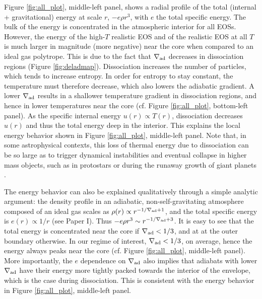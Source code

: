 \documentclass[apj]{emulateapj}
\newcommand{\delad}{\nabla_{\rm ad}}
\begin{document}
Figure \ref{fig:all_plot}, middle-left panel, shows a radial profile of the total (internal + gravitational) energy at scale $r$, $-e \rho r^3$, with $e$ the total specific energy.   %
The bulk of the energy is concentrated in the atmospheric interior for all EOSs. However, the energy of the high-$T$ realistic EOS and of the realistic EOS at all $T$ is much larger in magnitude (more negative) near the core when compared to an ideal gas polytrope. This is due to the fact that $\delad$ decreases in dissociation regions (Figure \ref{fig:deladmap}). Dissociation increases the number of particles, which tends to increase entropy. In order for entropy to stay constant, the temperature must therefore decrease, which also lowers the adiabatic gradient. A lower $\delad$ results in a shallower temperature gradient in dissociation regions, and hence in lower temperatures near the core (cf. Figure \ref{fig:all_plot}, bottom-left panel). As the specific internal energy $u(r) \propto T(r)$, dissociation decreases $u(r)$ and thus the total energy deep in the interior. This explains the local energy behavior shown in Figure \ref{fig:all_plot}, middle-left panel.  Note that, in some astrophysical contexts, this loss of thermal energy due to dissociation can be so large as to trigger dynamical instabilities and eventual collapse in higher mass objects, such as in protostars \citep{larson69} or during the runaway growth of giant planets \citep{bodenheimer80}.  



The energy behavior can also be explained qualitatively through a simple analytic argument: the density profile in an adiabatic, non-self-gravitating atmosphere composed of an ideal gas scales as $\rho(r) \propto r^{-1/\delad+1}$, and the total specific energy is $e(r) \propto 1/r$ (see Paper I). Thus $- e \rho r^3 \sim r^{-1/\delad+3}$. It is easy to see that the total energy is concentrated near the core if $\delad<1/3$, and at at the outer boundary otherwise. In our regime of interest, $\delad<1/3$, on average, hence the energy always peaks near the core (cf. Figure \ref{fig:all_plot}, middle-left panel). More importantly, the $e$ dependence on $\delad$ also implies that adiabats with lower $\delad$ have their energy more tightly packed towards the interior of the envelope, which is the case during dissociation. This is consistent with the energy behavior in Figure \ref{fig:all_plot}, middle-left panel. 
\end{document}
